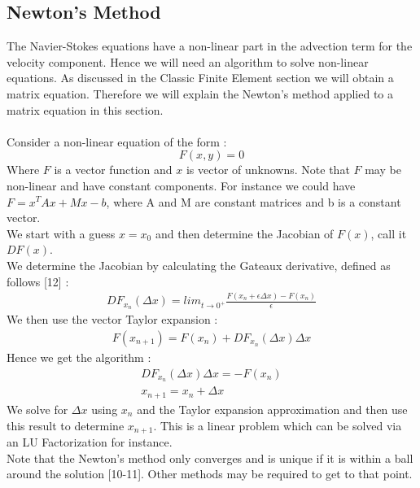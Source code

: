 \documentclass[11pt,twoside,a4paper]{article}
\begin{document}
\subsection{Newton's Method}
The Navier-Stokes equations have a non-linear part in the advection term for the velocity component. Hence we will need an algorithm to solve non-linear equations. As discussed in the Classic Finite Element section we will obtain a matrix equation. Therefore we will explain the Newton's method applied to a matrix equation in this section.\\
\\
Consider a non-linear equation of the form :
$$
F(x,y) = 0
$$
Where $F$ is a vector function and $x$ is vector of unknowns. Note that $F$ may be non-linear and have constant components.
For instance we could have $ F = x^T A x + M x - b$, where A and M are constant matrices and b is a constant vector.\\
We start with a guess $x = x_0$ and then determine the Jacobian of $F(x)$, call it $DF(x)$.\\
We determine the Jacobian by calculating the Gateaux derivative, defined as follows [12] :
\begin{align}
DF_{x_n}(\Delta x) = lim_{t \rightarrow 0^+} \frac{F(x_n+ \epsilon \Delta x) - F(x_n)}{\epsilon}
\end{align}
We then use the vector Taylor expansion :
\begin{align*}
F(x_{n+1}) = F(x_n) + DF_{x_n}(\Delta x) \Delta x
\end{align*}
Hence we get the algorithm :
\begin{align}
DF_{x_n}(\Delta x) \Delta x = - F(x_n)\\
x_{n+1} = x_n + \Delta x
\end{align}
We solve for $\Delta x$ using $x_n$ and the Taylor expansion approximation and then use this result to determine $x_{n+1}$.
This is a linear problem which can be solved via an LU Factorization for instance.\\
Note that the Newton's method only converges and is unique if it is within a ball around the solution [10-11]. Other methods may be required to get to that point.
\end{document}

